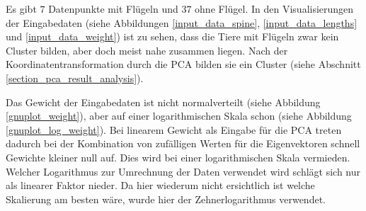  Es gibt $7$ Datenpunkte mit Flügeln und $37$ ohne Flügel. In den Visualisierungen der Eingabedaten (siehe Abbildungen \ref{input_data_spine}, \ref{input_data_lengths} und \ref{input_data_weight}) ist zu sehen, dass die Tiere mit Flügeln zwar kein Cluster bilden, aber doch meist nahe zusammen liegen. Nach der Koordinatentransformation durch die PCA bilden sie ein Cluster (siehe Abschnitt \ref{section_pca_result_analysis}). 

 Das Gewicht der Eingabedaten ist nicht normalverteilt (siehe Abbildung \ref{gnuplot_weight}), aber auf einer logarithmischen Skala schon (siehe Abbildung \ref{gnuplot_log_weight}). 
 Bei linearem Gewicht als Eingabe für die PCA treten dadurch bei der Kombination von zufälligen Werten für die Eigenvektoren schnell Gewichte kleiner null auf. Dies wird bei einer logarithmischen Skala vermieden.
 Welcher Logarithmus zur Umrechnung der Daten verwendet wird schlägt sich nur als linearer Faktor nieder. Da hier wiederum nicht ersichtlich ist welche Skalierung am besten wäre, wurde hier der Zehnerlogarithmus verwendet.

